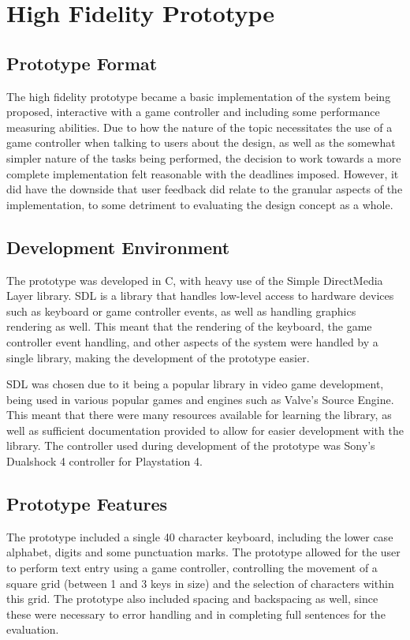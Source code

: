 \documentclass[prototype.tex]{subfiles}
\begin{document}
\section{High Fidelity Prototype} %
\label{sec:high_fidelity_prototype}
\subsection{Prototype Format} %
\label{sub:prototype_format}
The high fidelity prototype became a basic implementation of the system being
proposed, interactive with a game controller and including some performance
measuring abilities. Due to how the nature of the topic necessitates the use of
a game controller when talking to users about the design, as well as the
somewhat simpler nature of the tasks being performed, the decision to work
towards a more complete implementation felt reasonable with the deadlines
imposed. However, it did have the downside that user feedback did relate to the
granular aspects of the implementation, to some detriment to evaluating the
design concept as a whole.

\subsection{Development Environment} %
\label{sub:development_environment}
The prototype was developed in C, with heavy use of the Simple DirectMedia Layer
library. SDL is a library that handles low-level access to hardware devices such
as keyboard or game controller events, as well as handling graphics rendering as
well. This meant that the rendering of the keyboard, the game controller event
handling, and other aspects of the system were handled by a single library,
making the development of the prototype easier.

SDL was chosen due to it being a popular library in video game
development, being used in various popular games and engines such as Valve's
Source Engine. This meant that there were many resources available for learning
the library, as well as sufficient documentation provided to allow for easier
development with the library. The controller used during development of the
prototype was Sony's Dualshock 4 controller for Playstation 4.

\subsection{Prototype Features} %
\label{sub:prototype_features}
The prototype included a single 40 character keyboard, including the lower case
alphabet, digits and some punctuation marks. The prototype allowed for the user
to perform text entry using a game controller, controlling the movement of a
square grid (between 1 and 3 keys in size) and the selection of characters
within this grid. The prototype also included spacing and backspacing as well,
since these were necessary to error handling and in completing full sentences
for the evaluation.
\end{document}
